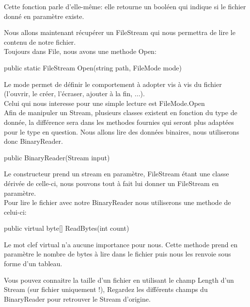 Cette fonction parle d'elle-même: elle retourne un booléen qui indique si le
fichier donné en paramètre existe.

Nous allons maintenant récupérer un FileStream qui nous permettra de lire le
contenu de notre fichier.\\ Toujours dans File, nous avons une methode Open:
\begin{code}
  public static FileStream Open(string path, FileMode mode)
\end{code}

Le mode permet de définir le comportement à adopter vis à vis du fichier
(l'ouvrir, le créer, l'écraser, ajouter à la fin, ...).\\ Celui qui nous
interesse pour une simple lecture est FileMode.Open\\ Afin de manipuler un
Stream, plusieurs classes existent en fonction du type de donnée, la différence
sera dans les methodes fournies qui seront plus adaptées pour le type en
question. Nous allons lire des données binaires, nous utiliserons donc
BinaryReader.

\begin{code}
public BinaryReader(Stream input)
\end{code}

Le constructeur prend un stream en paramètre, FileStream étant une classe
dérivée de celle-ci, nous pouvons tout à fait lui donner un FileStream en
paramètre.\\ Pour lire le fichier avec notre BinaryReader nous utiliserons une
methode de celui-ci:

\begin{code}
public virtual byte[] ReadBytes(int count)
\end{code}

Le mot clef virtual n'a aucune importance pour nous. Cette methode prend en
paramètre le nombre de bytes à lire dans le fichier puis nous les renvoie sous
forme d'un tableau.

Vous pouvez connaitre la taille d'un fichier en utilisant le champ Length d'un
Stream (sur fichier uniquement !), Regardez les différents champs du
BinaryReader pour retrouver le Stream d'origine.

\newpage
